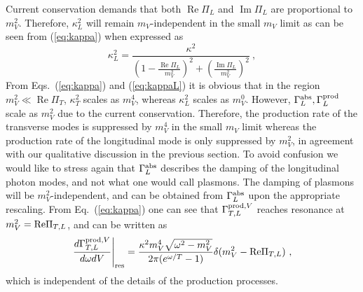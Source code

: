 \documentclass[12pt]{article}
\DeclareMathOperator{\real}{Re}
\DeclareMathOperator{\imag}{Im}
\begin{document}
Current conservation demands that both $\real \Pi_L$ and $\imag\Pi_L$
are proportional to $m_V^2$.  Therefore, $\kappa_L^2$ will remain
$m_V$-independent in the small $m_V$ limit as can be seen from
(\ref{eq:kappa}) when expressed as
\begin{equation}\label{eq:kappaL}
\kappa_{L}^{2} = \frac{\kappa^{2} } {\left(1 - \frac{\real \Pi_L}{m_V^2} \right)^{2} + \left(\frac{\imag \Pi_{L}}{m_{V}^{2}}\right)^{2}} \ ,
\end{equation}
%
From Eqs.~(\ref{eq:kappa}) and (\ref{eq:kappaL}) it is obvious that in
the region $m_V^2 \ll {\real \Pi_T}$, $\kappa_T^2$ scales as $m_V^4$,
whereas $\kappa_L^2$ scales as $m_V^0$. However, $\Gamma^{{\rm abs}}_{L}, 
\Gamma_L^{\rm prod}$ scale
as $m_V^2$ due to the current conservation. Therefore, the production
rate of the transverse modes is suppressed by $m_V^4$ in the small
$m_V$ limit whereas the production rate of the longitudinal mode is
only suppressed by $m_V^2$, in agreement with our qualitative
discussion in the previous section. To avoid confusion 
we would like to stress again that $\Gamma^{{\rm abs}}_{L}$ 
describes the damping of the longitudinal photon modes, and not 
what one would call plasmons. The damping of plasmons 
will be $m_V^2$-independent, and can be obtained from $\Gamma^{{\rm abs}}_{L}$ 
upon the appropriate rescaling. 
%
From Eq.~(\ref{eq:kappa}) one can see that $\Gamma^{{\rm prod},V}_{T,L}$ reaches resonance at $m_V^2 = {\rm Re}\Pi_{T,L}$, and can be written as 
\begin{equation}\label{eq:gammares}
\left.\frac{d\Gamma^{{\rm prod,}V}_{T,L}}{d\omega dV} \right|_{\rm res} = \frac{\kappa^2 m_V^4\sqrt{\omega^2 - m_V^2}}{2\pi(e^{\omega/T} - 1)} \delta(m_V^2 - {\rm Re}\Pi_{T,L}) \ ,
\end{equation} 
which is independent of the details of the production processes. 
\end{document}
